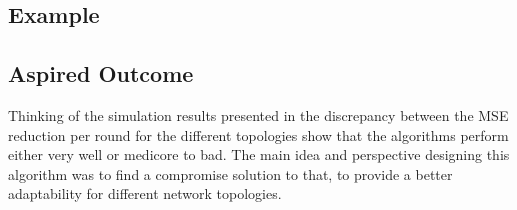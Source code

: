 \subsection{Example}\label{subsec:exampleAdaptiveThresholdPPS}
\subsection{Aspired Outcome}\label{subsec:aspiredOutcomeAdaptiveThresholdPPS}
Thinking of the simulation results presented in \cite{Bayazitoglu} the discrepancy between the MSE reduction per round for the different topologies show that the algorithms perform either very well or medicore to bad. The main idea and perspective designing this algorithm was to find a compromise solution to that, to provide a better adaptability for different network topologies.
